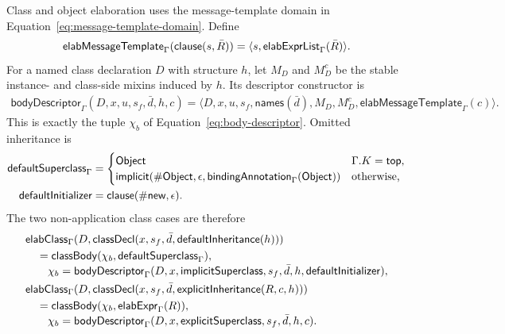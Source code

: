 Class and object elaboration uses the message-template domain in
Equation~\eqref{eq:message-template-domain}.  Define
\begin{equation}\label{eq:front-end-message-template}
 \mathsf{elabMessageTemplate}_{\Gamma}
   (\mathsf{clause}(s,\bar R))=
   \langle s,\mathsf{elabExprList}_{\Gamma}(\bar R)\rangle.
\end{equation}
For a named class declaration $D$ with structure $h$, let $M_D$ and $M_D^c$
be the stable instance- and class-side mixins induced by $h$.  Its descriptor
constructor is
\begin{equation}\label{eq:front-end-body-descriptor}
\begin{aligned}
 \mathsf{bodyDescriptor}_{\Gamma}
   (D,x,u,s_f,\bar d,h,c)
   =\langle D,x,u,s_f,\mathsf{names}(\bar d),
      M_D,M_D^c,\mathsf{elabMessageTemplate}_{\Gamma}(c)\rangle.
\end{aligned}
\end{equation}
This is exactly the tuple $\chi_b$ of Equation~\eqref{eq:body-descriptor}.
Omitted inheritance is
\begin{equation}\label{eq:front-end-default-superclass}
\begin{aligned}
 \mathsf{defaultSuperclass}_{\Gamma}&=
  \begin{cases}
   \mathsf{Object}&\Gamma.K=\mathsf{top},\\
   \mathsf{implicit}(\#\mathsf{Object},\epsilon,
      \mathsf{bindingAnnotation}_{\Gamma}(\mathsf{Object}))&\text{otherwise,}
  \end{cases}\\
 \mathsf{defaultInitializer}&=\mathsf{clause}(\#\mathsf{new},\epsilon).
\end{aligned}
\end{equation}
The two non-application class cases are therefore
\begin{equation}\label{eq:front-end-class-body-elaboration}
\begin{aligned}
 &\mathsf{elabClass}_{\Gamma}
  (D,\mathsf{classDecl}(x,s_f,\bar d,\mathsf{defaultInheritance}(h)))\\
 &\quad=\mathsf{classBody}(\chi_b,\mathsf{defaultSuperclass}_{\Gamma}),\\[-1mm]
 &\qquad\chi_b=\mathsf{bodyDescriptor}_{\Gamma}
      (D,x,\mathsf{implicitSuperclass},s_f,\bar d,h,
       \mathsf{defaultInitializer}),\\
 &\mathsf{elabClass}_{\Gamma}
  (D,\mathsf{classDecl}(x,s_f,\bar d,
       \mathsf{explicitInheritance}(R,c,h)))\\
 &\quad=\mathsf{classBody}
   (\chi_b,\mathsf{elabExpr}_{\Gamma}(R)),\\[-1mm]
 &\qquad\chi_b=\mathsf{bodyDescriptor}_{\Gamma}
      (D,x,\mathsf{explicitSuperclass},s_f,\bar d,h,c).
\end{aligned}
\end{equation}

